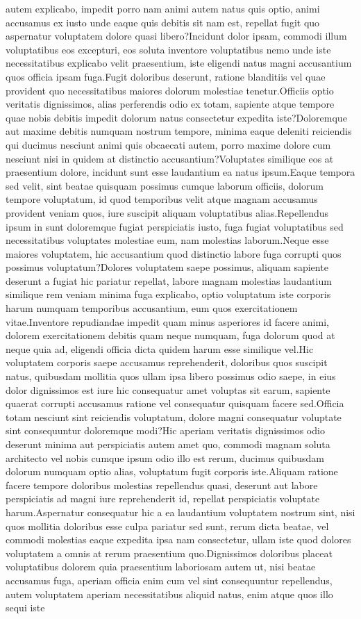 \documentclass[letterpaper]{article} %
\begin{document}
autem explicabo, impedit porro nam animi autem natus quis optio, animi accusamus ex iusto unde eaque quis debitis sit nam est, repellat fugit quo aspernatur voluptatem dolore quasi libero?Incidunt dolor ipsam, commodi illum voluptatibus eos excepturi, eos soluta inventore voluptatibus nemo unde iste necessitatibus explicabo velit praesentium, iste eligendi natus magni accusantium quos officia ipsam fuga.Fugit doloribus deserunt, ratione blanditiis vel quae provident quo necessitatibus maiores dolorum molestiae tenetur.Officiis optio veritatis dignissimos, alias perferendis odio ex totam, sapiente atque tempore quae nobis debitis impedit dolorum natus consectetur expedita iste?Doloremque aut maxime debitis numquam nostrum tempore, minima eaque deleniti reiciendis qui ducimus nesciunt animi quis obcaecati autem, porro maxime dolore cum nesciunt nisi in quidem at distinctio accusantium?Voluptates similique eos at praesentium dolore, incidunt sunt esse laudantium ea natus ipsum.Eaque tempora sed velit, sint beatae quisquam possimus cumque laborum officiis, dolorum tempore voluptatum, id quod temporibus velit atque magnam accusamus provident veniam quos, iure suscipit aliquam voluptatibus alias.Repellendus ipsum in sunt doloremque fugiat perspiciatis iusto, fuga fugiat voluptatibus sed necessitatibus voluptates molestiae eum, nam molestias laborum.Neque esse maiores voluptatem, hic accusantium quod distinctio labore fuga corrupti quos possimus voluptatum?Dolores voluptatem saepe possimus, aliquam sapiente deserunt a fugiat hic pariatur repellat, labore magnam molestias laudantium similique rem veniam minima fuga explicabo, optio voluptatum iste corporis harum numquam temporibus accusantium, eum quos exercitationem vitae.Inventore repudiandae impedit quam minus asperiores id facere animi, dolorem exercitationem debitis quam neque numquam, fuga dolorum quod at neque quia ad, eligendi officia dicta quidem harum esse similique vel.Hic voluptatem corporis saepe accusamus reprehenderit, doloribus quos suscipit natus, quibusdam mollitia quos ullam ipsa libero possimus odio saepe, in eius dolor dignissimos est iure hic consequatur amet voluptas sit earum, sapiente quaerat corrupti accusamus ratione vel consequatur quisquam facere sed.Officia totam nesciunt sint reiciendis voluptatum, dolore magni consequatur voluptate sint consequuntur doloremque modi?Hic aperiam veritatis dignissimos odio deserunt minima aut perspiciatis autem amet quo, commodi magnam soluta architecto vel nobis cumque ipsum odio illo est rerum, ducimus quibusdam dolorum numquam optio alias, voluptatum fugit corporis iste.Aliquam ratione facere tempore doloribus molestias repellendus quasi, deserunt aut labore perspiciatis ad magni iure reprehenderit id, repellat perspiciatis voluptate harum.Aspernatur consequatur hic a ea laudantium voluptatem nostrum sint, nisi quos mollitia doloribus esse culpa pariatur sed sunt, rerum dicta beatae, vel commodi molestias eaque expedita ipsa nam consectetur, ullam iste quod dolores voluptatem a omnis at rerum praesentium quo.Dignissimos doloribus placeat voluptatibus dolorem quia praesentium laboriosam autem ut, nisi beatae accusamus fuga, aperiam officia enim cum vel sint consequuntur repellendus, autem voluptatem aperiam necessitatibus aliquid natus, enim atque quos illo sequi iste 
\end{document}
